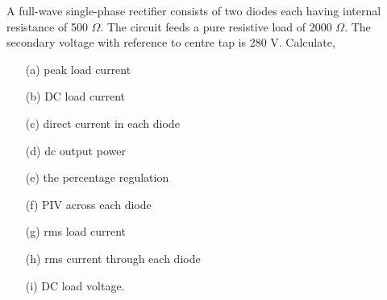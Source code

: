 \begin{example}\label{exam2.6}
A full-wave single-phase rectifier consists of two diodes each having
internal resistance of 500 $\Omega$. The circuit feeds a pure resistive
load of 2000 $\Omega$. The secondary voltage with reference to centre
tap is 280 V. Calculate,
\begin{itemize}
\item[(a)] peak load current

\item[(b)] DC load current

\item[(c)] direct current in each diode 

\item[(d)] dc output power

\item[(e)] the percentage regulation

\item[(f)] PIV across each diode

\item[(g)] rms load current

\item[(h)] rms current through each diode 

\item[(i)] DC load voltage.
\end{itemize}
\end{example}

